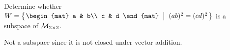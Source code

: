 

\begin{Exercise}[
name={},
title={}, 
difficulty=0,
origin={\cite{YL}}]
Determine whether\\
$W=\set{\begin{mat}
a & b\\
c & d
\end{mat}
\suchthat
(ab)^2=(cd)^2}$
is a subspace of $\mathcal{M}_{2\times 2}$.

\end{Exercise}

\begin{Answer}
Not a subspace since it is not closed under vector addition.
\end{Answer}
